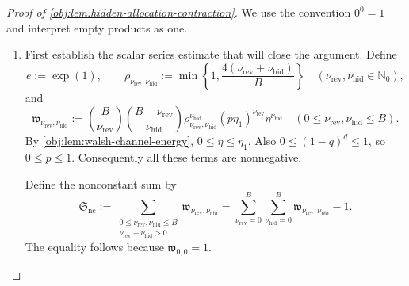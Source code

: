 \begin{proof}[Proof of \cref{obj:lem:hidden-allocation-contraction}]
We use the convention \(0^0=1\) and interpret empty products as one.

\begin{enumerate}
\item First establish the scalar series estimate that will close the argument. Define
\[
e:=\exp(1),
\qquad
\rho_{\nu_{\mathrm{rev}},\nu_{\mathrm{hid}}}
:=
\min\left\{1,\frac{4(\nu_{\mathrm{rev}}+\nu_{\mathrm{hid}})}{B}\right\}
\quad
(\nu_{\mathrm{rev}},\nu_{\mathrm{hid}}\in\mathbb N_0),
\]
and
\[
\mathfrak w_{\nu_{\mathrm{rev}},\nu_{\mathrm{hid}}}
:=
\binom B{\nu_{\mathrm{rev}}}
\binom{B-\nu_{\mathrm{rev}}}{\nu_{\mathrm{hid}}}
\rho_{\nu_{\mathrm{rev}},\nu_{\mathrm{hid}}}^{\nu_{\mathrm{hid}}}
(p\eta_1)^{\nu_{\mathrm{rev}}}\eta^{\nu_{\mathrm{hid}}}
\quad
(0\le\nu_{\mathrm{rev}},\nu_{\mathrm{hid}}\le B).
\]
By \cref{obj:lem:walsh-channel-energy},
\(0\le\eta\le\eta_1\). Also \(0\le(1-q)^d\le1\), so \(0\le p\le1\).
Consequently all these terms are nonnegative.

Define the nonconstant sum by
\[
\mathfrak S_{\mathrm{nc}}
:=
\sum_{\substack{0\le\nu_{\mathrm{rev}},\nu_{\mathrm{hid}}\le B\\
\nu_{\mathrm{rev}}+\nu_{\mathrm{hid}}>0}}
\mathfrak w_{\nu_{\mathrm{rev}},\nu_{\mathrm{hid}}}
=
\sum_{\nu_{\mathrm{rev}}=0}^B
\sum_{\nu_{\mathrm{hid}}=0}^B
\mathfrak w_{\nu_{\mathrm{rev}},\nu_{\mathrm{hid}}}-1.
\]
The equality follows because \(\mathfrak w_{0,0}=1\).


\end{enumerate}
\end{proof}

